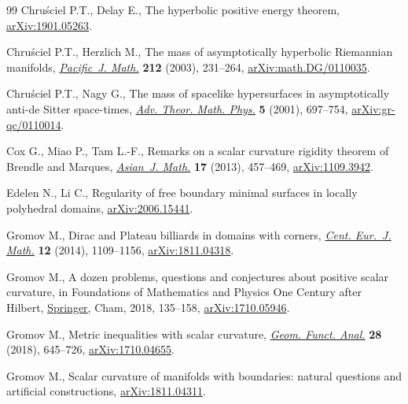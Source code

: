 \begin{thebibliography}{99}
Chru\'sciel P.T., Delay E., The hyperbolic positive energy theorem,
 \href{https://arxiv.org/abs/1901.05263}{arXiv:1901.05263}.

Chru\'sciel P.T., Herzlich M., The mass of asymptotically hyperbolic
 {R}iemannian manifolds, \href{https://doi.org/10.2140/pjm.2003.212.231}{\textit{Pacific~J. Math.}} \textbf{212} (2003),
 231--264, \href{https://arxiv.org/abs/math.DG/0110035}{arXiv:math.DG/0110035}.

Chru\'sciel P.T., Nagy G., The mass of spacelike hypersurfaces in
 asymptotically anti-de {S}itter space-times, \href{https://doi.org/10.4310/ATMP.2001.v5.n4.a3}{\textit{Adv. Theor. Math. Phys.}}
 \textbf{5} (2001), 697--754, \href{https://arxiv.org/abs/gr-qc/0110014}{arXiv:gr-qc/0110014}.

Cox G., Miao P., Tam L.-F., Remarks on a scalar curvature rigidity theorem of
 {B}rendle and {M}arques, \href{https://doi.org/10.4310/AJM.2013.v17.n3.a4}{\textit{Asian~J. Math.}} \textbf{17} (2013),
 457--469, \href{https://arxiv.org/abs/1109.3942}{arXiv:1109.3942}.

Edelen N., Li C., Regularity of free boundary minimal surfaces in locally
 polyhedral domains, \href{https://arxiv.org/abs/2006.15441}{arXiv:2006.15441}.

Gromov M., Dirac and {P}lateau billiards in domains with corners, \href{https://doi.org/10.2478/s11533-013-0399-1}{\textit{Cent.
 Eur.~J. Math.}} \textbf{12} (2014), 1109--1156, \href{https://arxiv.org/abs/1811.04318}{arXiv:1811.04318}.

Gromov M., A dozen problems, questions and conjectures about positive scalar
 curvature, in Foundations of Mathematics and Physics One Century after
 {H}ilbert, \href{https://doi.org/10.1007/978-3-319-64813-2_6}{Springer}, Cham, 2018, 135--158, \href{https://arxiv.org/abs/1710.05946}{arXiv:1710.05946}.

Gromov M., Metric inequalities with scalar curvature, \href{https://doi.org/10.1007/s00039-018-0453-z}{\textit{Geom. Funct.
 Anal.}} \textbf{28} (2018), 645--726, \href{https://arxiv.org/abs/1710.04655}{arXiv:1710.04655}.

Gromov M., Scalar curvature of manifolds with boundaries: natural questions and
 artificial constructions, \href{https://arxiv.org/abs/1811.04311}{arXiv:1811.04311}.


\end{thebibliography}
